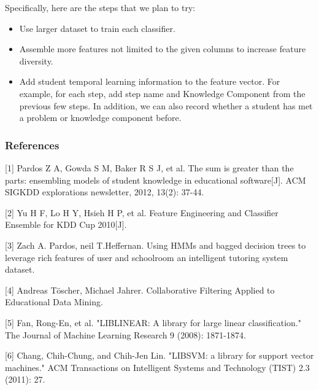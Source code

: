 \documentclass{article} %
\begin{document}
Specifically, here are the steps that we plan to try:
\begin{itemize}
\item Use larger dataset to train each classifier.
\item Assemble more features not limited to the given columns to increase feature diversity.
\item Add student temporal learning information to the feature vector. For example, for each step, add step name and Knowledge Component from the previous few steps. In addition, we can also record whether a student has met a problem or knowledge component before.
\end{itemize}

\subsubsection*{References}
\small{
[1] Pardos Z A, Gowda S M, Baker R S J, et al. The sum is greater than the parts: ensembling models of student knowledge in educational software[J]. ACM SIGKDD explorations newsletter, 2012, 13(2): 37-44.

[2] Yu H F, Lo H Y, Hsieh H P, et al. Feature Engineering and Classifier Ensemble for KDD Cup 2010[J].

[3] Zach A. Pardos, neil T.Heffernan. Using HMMs and bagged decision trees to leverage rich features of user and schoolroom an intelligent tutoring system dataset. 

[4] Andreas T\"{o}scher, Michael Jahrer. Collaborative Filtering Applied to Educational Data Mining.

[5] Fan, Rong-En, et al. "LIBLINEAR: A library for large linear classification." The Journal of Machine Learning Research 9 (2008): 1871-1874.

[6] Chang, Chih-Chung, and Chih-Jen Lin. "LIBSVM: a library for support vector machines." ACM Transactions on Intelligent Systems and Technology (TIST) 2.3 (2011): 27.


}
\end{document}
